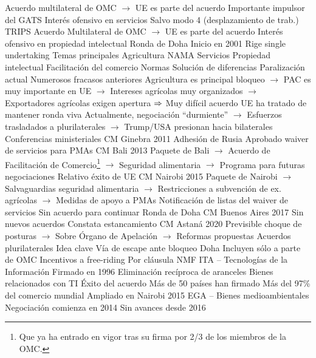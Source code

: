 \documentclass{nuevotema}
\begin{document}
\begin{esquemal}
				\4 Acuerdo multilateral de OMC
				\4[] $\to$ UE es parte del acuerdo
				\4 Importante impulsor del GATS
				\4 Interés ofensivo en servicios
				\4[] Salvo modo 4 (desplazamiento de trab.)
			\3 TRIPS
				\4 Acuerdo Multilateral de OMC
				\4[] $\to$ UE es parte del acuerdo
				\4 Interés ofensivo en propiedad intelectual
			\3 Ronda de Doha
				\4 Inicio en 2001
				\4 Rige single undertaking
				\4 Temas principales
				\4[] Agricultura
				\4[] NAMA
				\4[] Servicios
				\4[] Propiedad intelectual
				\4[] Facilitación del comercio
				\4[] Normas
				\4[] Solución de diferencias
				\4 Paralización actual
				\4[] Numerosos fracasos anteriores
				\4[] Agricultura es principal bloqueo
				\4[] $\to$ PAC es muy importante en UE
				\4[] $\to$ Intereses agrícolas muy organizados
				\4[] $\to$ Exportadores agrícolas exigen apertura
				\4[] $\Rightarrow$ Muy difícil acuerdo
				\4[] UE ha tratado de mantener ronda viva
				\4[] Actualmente, negociación ``durmiente''
				\4[] $\to$ Esfuerzos trasladados a plurilaterales
				\4[] $\to$ Trump/USA presionan hacia bilaterales
			\3 Conferencias ministeriales
				\4 CM Ginebra 2011
				\4[] Adhesión de Rusia
				\4[] Aprobado waiver de servicios para PMAs
				\4 CM Bali 2013
				\4[] Paquete de Bali
				\4[] $\to$ Acuerdo de Facilitación de Comercio\footnote{Que ya ha entrado en vigor tras su firma por 2/3 de los miembros de la OMC.}
				\4[] $\to$ Seguridad alimentaria
				\4[] $\to$ Programa para futuras negociaciones
				\4[] Relativo éxito de UE
				\4 CM Nairobi 2015
				\4[] Paquete de Nairobi
				\4[] $\to$ Salvaguardias seguridad alimentaria
				\4[] $\to$ Restricciones a subvención de ex. agrícolas
				\4[] $\to$ Medidas de apoyo a PMAs
				\4[] Notificación de listas del waiver de servicios
				\4[] Sin acuerdo para continuar Ronda de Doha
				\4 CM Buenos Aires 2017
				\4[] Sin nuevos acuerdos
				\4[] Constata estancamiento
				\4 CM Astaná 2020
				\4[] Previsible choque de posturas
				\4[] $\to$ Sobre Órgano de Apelación
				\4[] $\to$ Reformas propuestas
		\2 Acuerdos plurilaterales
			\3 Idea clave
				\4 Vía de escape ante bloqueo Doha
				\4 Incluyen sólo a parte de OMC
				\4 Incentivos a free-riding
				\4[] Por cláusula NMF
			\3 ITA -- Tecnologías de la Información
				\4 Firmado en 1996
				\4 Eliminación recíproca de aranceles
				\4[] Bienes relacionados con TI
				\4 Éxito del acuerdo
				\4[] Más de 50 países han firmado
				\4[] Más del 97\% del comercio mundial
				\4 Ampliado en Nairobi 2015
			\3 EGA -- Bienes medioambientales
				\4 Negociación comienza en 2014
				\4[] Sin avances desde 2016

\end{esquemal}
\end{document}
